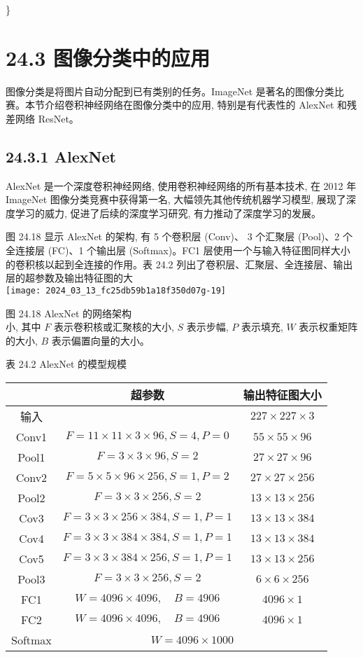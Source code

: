 \documentclass[10pt]{article}
\begin{document}
\}

\section*{24.3 图像分类中的应用}
图像分类是将图片自动分配到已有类别的任务。ImageNet 是著名的图像分类比赛。本节介绍卷积神经网络在图像分类中的应用, 特别是有代表性的 AlexNet 和残差网络 ResNet。

\subsection*{24.3.1 AlexNet}
AlexNet 是一个深度卷积神经网络, 使用卷积神经网络的所有基本技术, 在 2012 年 ImageNet 图像分类竞赛中获得第一名, 大幅领先其他传统机器学习模型, 展现了深度学习的威力, 促进了后续的深度学习研究, 有力推动了深度学习的发展。

图 24.18 显示 AlexNet 的架构, 有 5 个卷积层 (Conv)、 3 个汇聚层 (Pool)、2 个全连接层 (FC)、1 个输出层 (Softmax)。FC1 层使用一个与输入特征图同样大小的卷积核以起到全连接的作用。表 24.2 列出了卷积层、汇聚层、全连接层、输出层的超参数及输出特征图的大\\
\texttt{[image: 2024\_03\_13\_fc25db59b1a18f350d07g-19]}

图 24.18 AlexNet 的网络架构\\
小, 其中 $F$ 表示卷积核或汇聚核的大小, $S$ 表示步幅, $P$ 表示填充, $W$ 表示权重矩阵的大小, $B$ 表示偏置向量的大小。

表 24.2 AlexNet 的模型规模

\begin{center}
\begin{tabular}{c|c|c}
\hline
 & 超参数 & 输出特征图大小 \\
\hline
输入 &  & $227 \times 227 \times 3$ \\
\hline
Conv1 & $F=11 \times 11 \times 3 \times 96, S=4, P=0$ & $55 \times 55 \times 96$ \\
\hline
Pool1 & $F=3 \times 3 \times 96, S=2$ & $27 \times 27 \times 96$ \\
\hline
Conv2 & $F=5 \times 5 \times 96 \times 256, S=1, P=2$ & $27 \times 27 \times 256$ \\
\hline
Pool2 & $F=3 \times 3 \times 256, S=2$ & $13 \times 13 \times 256$ \\
\hline
Cov3 & $F=3 \times 3 \times 256 \times 384, S=1, P=1$ & $13 \times 13 \times 384$ \\
\hline
Cov4 & $F=3 \times 3 \times 384 \times 384, S=1, P=1$ & $13 \times 13 \times 384$ \\
\hline
Cov5 & $F=3 \times 3 \times 384 \times 256, S=1, P=1$ & $13 \times 13 \times 256$ \\
\hline
Pool3 & $F=3 \times 3 \times 256, S=2$ & $6 \times 6 \times 256$ \\
\hline
FC1 & $W=4096 \times 4096, \quad B=4906$ & $4096 \times 1$ \\
\hline
FC2 & $W=4096 \times 4096, \quad B=4906$ & $4096 \times 1$ \\
\hline
Softmax & \multicolumn{2}{|c}{$W=4096 \times 1000$} \\
\hline
\end{tabular}
\end{center}
\end{document}
